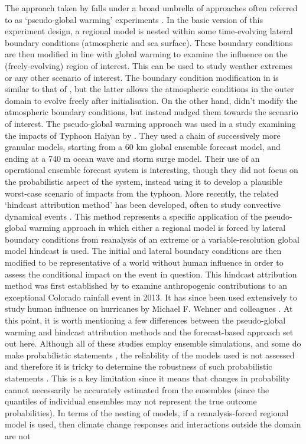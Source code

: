     The approach taken by \citeauthor{meredith_crucial_2015} falls under a broad umbrella of approaches often referred to as `pseudo-global warming' experiments \citep{schar_surrogate_1996}. In the basic version of this experiment design, a regional model is nested within some time-evolving lateral boundary conditions (atmospheric and sea surface). These boundary conditions are then modified in line with global warming to examine the influence on the (freely-evolving) region of interest. This can be used to study weather extremes or any other scenario of interest. The boundary condition modification in \citeauthor{schar_surrogate_1996} is similar to that of \citeauthor[]{lackmann_hurricane_2015}, but the latter allows the atmospheric conditions in the outer domain to evolve freely after initialisation. On the other hand, \citeauthor[]{meredith_crucial_2015} didn't modify the atmospheric boundary conditions, but instead nudged them towards the scenario of interest. The pseudo-global warming approach was used in a study examining the impacts of Typhoon Haiyan by \citet{takayabu_climate_2015}. They used a chain of successively more granular models, starting from a 60 km global ensemble forecast model, and ending at a 740 m ocean wave and storm surge model. Their use of an operational ensemble forecast system is interesting, though they did not focus on the probabilistic aspect of the system, instead using it to develop a plausible worst-case scenario of impacts from the typhoon. More recently, the related `hindcast attribution method' has been developed, often to study convective dynamical events \citep{wehner_estimating_2019}. This method represents a specific application of the pseudo-global warming approach in which either a regional model is forced by lateral boundary conditions from reanalysis of an extreme or a variable-resolution global model hindcast is used. The initial and lateral boundary conditions are then modified to be representative of a world without human influence in order to assess the conditional impact on the event in question. This hindcast attribution method was first established by \citet{pall_diagnosing_2017} to examine anthropogenic contributions to an exceptional Colorado rainfall event in 2013. It has since been used extensively to study human influence on hurricanes by Michael F. Wehner and colleagues \citep{patricola_anthropogenic_2018,reed_forecasted_2020,reed_attribution_2022}. At this point, it is worth mentioning a few differences between the pseudo-global warming and hindcast attribution methods and the forecast-based approach set out here. Although all of these studies employ ensemble simulations, and some do make probabilistic statements \citep{pall_diagnosing_2017}, the reliability of the models used is not assessed and therefore it is tricky to determine the robustness of such probabilistic statements \citep{bellprat_towards_2019,weisheimer_reliability_2014}. This is a key limitation since it means that changes in probability cannot necessarily be accurately estimated from the ensembles (since the quantiles of individual ensembles may not represent the true outcome probabilities). In terms of the nesting of models, if a reanalysis-forced regional model is used, then climate change responses and interactions outside the domain are not 